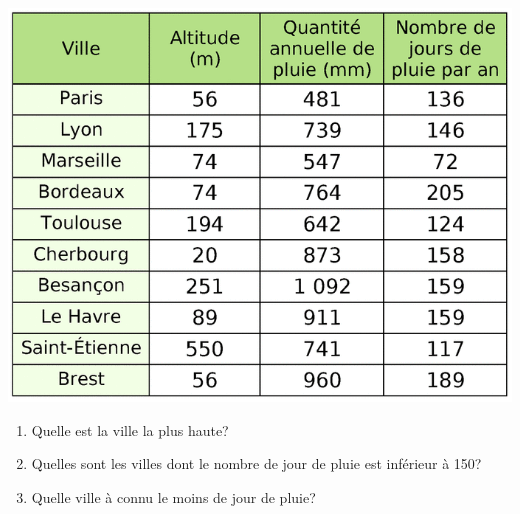 \documentclass[12pt,a4paper]{article}
\begin{document}
\begin{minipage}{0.35\textwidth}
\includegraphics[scale=0.28]{img/IE-tableau.png} 
\end{minipage}
\begin{minipage}{0.5\textwidth}
\begin{enumerate}
\item Quelle est la ville la plus haute?\\  
\item Quelles sont les villes dont le nombre de jour de pluie est inférieur à 150?\\ 
\item Quelle ville à connu le moins de jour de pluie?\\ 
\end{enumerate}
\end{minipage} \\
\end{document}
